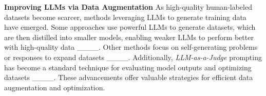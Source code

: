 \textbf{Improving LLMs via Data Augmentation}
As high-quality human-labeled datasets become scarcer, methods leveraging LLMs to generate training data have emerged. Some approaches use powerful LLMs to generate datasets, which are then distilled into smaller models, enabling weaker LLMs to perform better with high-quality data ____. Other methods focus on self-generating problems or responses to expand datasets ____. Additionally, \textit{LLM-as-a-Judge} prompting has become a standard technique for evaluating model outputs and optimizing datasets ____. These advancements offer valuable strategies for efficient data augmentation and optimization.

